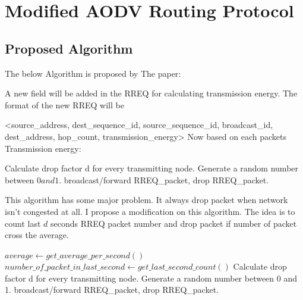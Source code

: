 \section{Modified AODV Routing Protocol}
\subsection{Proposed Algorithm}
The below Algorithm is proposed by The paper:


A new field will be added in
the RREQ for calculating transmission energy. The format of
the new RREQ will be


<source\_address, dest\_sequence\_id, source\_sequence\_id,
broadcast\_id, dest\_address, hop\_count, transmission\_energy>
Now based on each packets Transmission energy:
\begin{algorithmic}
\State Calculate drop factor d for every transmitting node.
\State Generate a random number between $0 and 1.$
    \State broadcast/forward RREQ\_packet,
\Else
\State drop RREQ\_packet.
\EndIf
\end{algorithmic}
This algorithm has some major problem. It always drop packet when network isn't congested at all.
I propose a modification on this algorithm. The idea is to count last $d$ seconds RREQ packet number and drop packet if number of packet cross the average.

\begin{algorithmic}
\State $average \gets get\_average\_per\_second()$
\State $number\_of\_packet\_in\_last\_second \gets get\_last\_second\_count()$
\State Calculate drop factor d for every transmitting node.
\State Generate a random number between 0 and 1.
    \State broadcast/forward RREQ\_packet,
\Else
\State drop RREQ\_packet.
\EndIf
\end{algorithmic}

